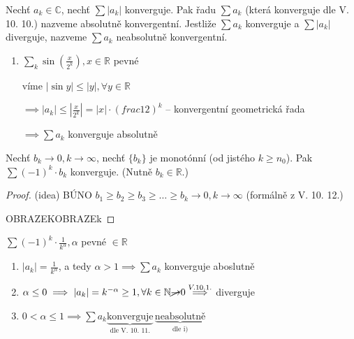 \begin{definice}
  Nechť $a_k\in \mathbb C$, nechť $\sum |a_k|$ konverguje. Pak řadu $\sum a_k$ (která konverguje dle V. 10. 10.) nazveme absolutně konvergentní. Jestliže $\sum a_k$ konverguje a $\sum |a_k|$ diverguje, nazveme $\sum a_k$ neabsolutně konvergentní.
\end{definice}

\begin{priklad}
  \begin{enumerate}[1)]
    \item $\sum_k \sin \left(\frac{x}{2^k}\right), x \in \mathbb R$ pevné

    víme $|\sin y| \leq |y|, \forall y \in \mathbb R$

    $\implies |a_k| \leq |\frac{x}{2^k}| = |x| \cdot \left(frac{1}{2}\right)^k$ -- konvergentní geometrická řada

    $\implies \sum a_k$ konverguje absolutně
  \end{enumerate}
\end{priklad}

\begin{veta}
  Nechť $b_k \to 0, k \to \infty$, nechť $\{b_k\}$ je monotónní (od jistého $k \geq n_0$). Pak $\sum (-1)^k \cdot b_k$ konverguje. (Nutně $b_k \in \mathbb R$.)
\end{veta}

\begin{proof}
  (idea) BÚNO $b_1 \geq b_2 \geq b_3 \geq \dots \geq b_k \to 0, k \to \infty$ (formálně z V. 10. 12.)

  OBRAZEKOBRAZEk
\end{proof}

\begin{priklad}
    $\sum (-1)^k \cdot \frac{1}{k^\alpha}, \alpha$ pevné $\in \mathbb R$
    \begin{enumerate}
        \item $|a_k| = \frac{1}{k^\alpha}$, a tedy $\alpha >1 \implies \sum a_k$ konverguje aboslutně
        \item $\alpha \leq 0 \implies |a_k| = k^{-\alpha} \geq 1, \forall k \in \mathbb N \cancel{\to} 0 \stackrel{V. 10. 1.}{\implies}$ diverguje
        \item $0 < \alpha \leq 1 \implies \sum a_k \underbrace{\text{konverguje}}_{\text{dle V. 10. 11.}}\, \underbrace{\text{neabsolutně}}_{\text{dle i)}}$
    \end{enumerate}
\end{priklad}

